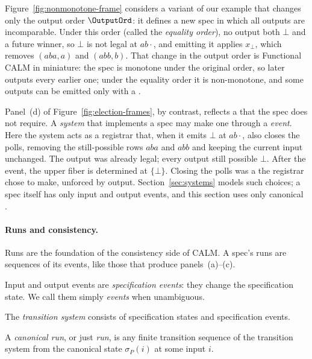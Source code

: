 Figure~\ref{fig:nonmonotone-frame} considers a variant of our example that
changes only the output order $\OutputOrd$: it defines a new spec in which all
outputs are incomparable.
Under this order (called the \emph{equality order}), no output \outrel both $\bot$ and a future winner, so $\bot$ is not legal at $ab\cdot$, and emitting it applies
$x_\bot$, which removes $(aba,a)$ and $(abb,b)$.  That change in the output
order is Functional CALM in miniature: the spec is monotone under the original
order, so later outputs \outrelbase every earlier one; under the equality order
it is non-monotone, and some outputs can be emitted only with a \commitment.

Panel~(d) of Figure~\ref{fig:election-frames}, by contrast, reflects a
\commitment that the spec does not require.  A \emph{system} that implements a
spec may make one through a \emph{\commitment event}.  Here the system acts as
a registrar that, when it emits $\bot$ at $ab\cdot$, also closes the polls,
removing the still-possible rows $aba$ and $abb$ and keeping the current input
unchanged.  The output was already legal; every output still possible
\outrelpast $\bot$.  After the event, the upper fiber is determined at
$\{\bot\}$.  Closing the polls was a \commitment the registrar chose to make, unforced by output.
Section~\ref{sec:systems} models such choices; a spec itself has only input and
output events, and this section uses only canonical \commitments.

\paragraph{Runs and consistency.}
Runs are the foundation of the consistency side of CALM.  A spec's runs are
sequences of its events, like those that produce panels~(a)--(c).

\begin{definition}
\label{def:specification-event}
Input and output events are \emph{specification events}: they change the
specification state.  We call them simply \emph{events} when unambiguous.
\end{definition}

\begin{definition}
\label{def:transition-system}
The \emph{transition system} consists of specification states and
specification events.
\end{definition}

\begin{definition}
\label{def:run}
A \emph{canonical run}, or just \emph{run}, is any finite transition sequence of the transition system from the
canonical state $\sigma_P(i)$ at some input $i$.
\end{definition}

